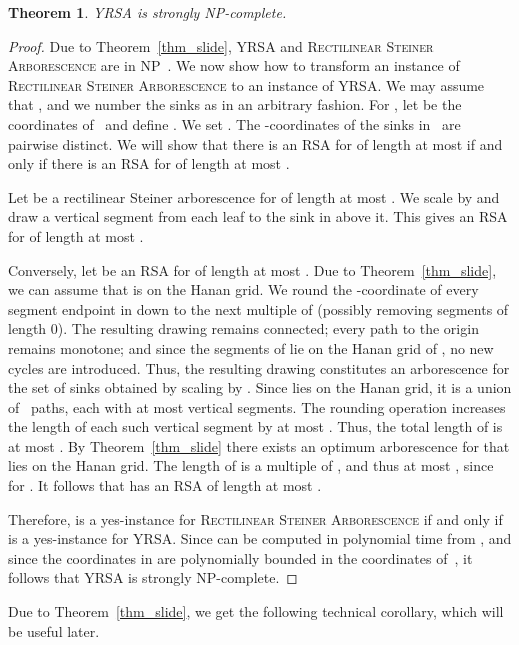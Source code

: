 \documentclass[a4paper,11pt]{article}
\newtheorem{theorem}{Theorem}[section]
\newcommand{\qedopt}{}
\begin{document}
\begin{theorem}\label{thm_yrsa}
\textup{YRSA} is strongly \textup{NP}-complete.
\end{theorem}


\begin{proof}
Due to Theorem~\ref{thm_slide}, YRSA and 
\textsc{Rectilinear Steiner Arborescence} 
are in NP~\cite{shi_su}.
We now show how to transform an instance
 of \textsc{Rectilinear Steiner Arborescence} to an
instance of YRSA. 
We may assume that , and we number the sinks as  in an arbitrary fashion.
For , let  be the coordinates of~ and define .
We set .
The -coordinates of the sinks in~ are pairwise distinct.
We will show that there is an RSA for  of length at most 
if and only if there is an RSA for  of length at most
. 

Let  be a rectilinear Steiner arborescence for  of length at most .
We scale  by  and draw a vertical segment from each leaf to the sink in 
above it.
This gives an RSA for  of length at most .

Conversely, let  be an RSA for  of length at most .
Due to Theorem~\ref{thm_slide}, we can assume that  is on the Hanan grid.
We round the -coordinate of every segment endpoint in 
 down to the next multiple of  (possibly removing segments of length 0).
The resulting drawing remains connected; every path to the origin 
remains monotone; and since the segments of  lie on the
Hanan grid of , no new cycles are introduced. 
Thus, the resulting drawing constitutes an arborescence  for 
the set  of sinks obtained by scaling  by .
Since  lies on the Hanan grid, it is a union of~ paths, each with
at most  vertical segments. 
The rounding operation increases the length of
each such vertical segment by at most .
Thus, the total length of  is at most
. By Theorem~\ref{thm_slide}
there exists an optimum arborescence  for
 that lies on the Hanan grid. The
length of  is a multiple of , and thus
at most , since  for .
 It follows that  has an RSA of length at most .


Therefore,  is a yes-instance for \textsc{Rectilinear Steiner
Arborescence} if and only if  is a yes-instance for
YRSA. Since  can be computed in polynomial time 
from , and since the coordinates in
 are polynomially bounded in the coordinates of~, it follows that 
YRSA is strongly NP-complete.
\qedopt
\end{proof}

Due to Theorem~\ref{thm_slide}, we get the following technical corollary, which will be useful later.
\end{document}
